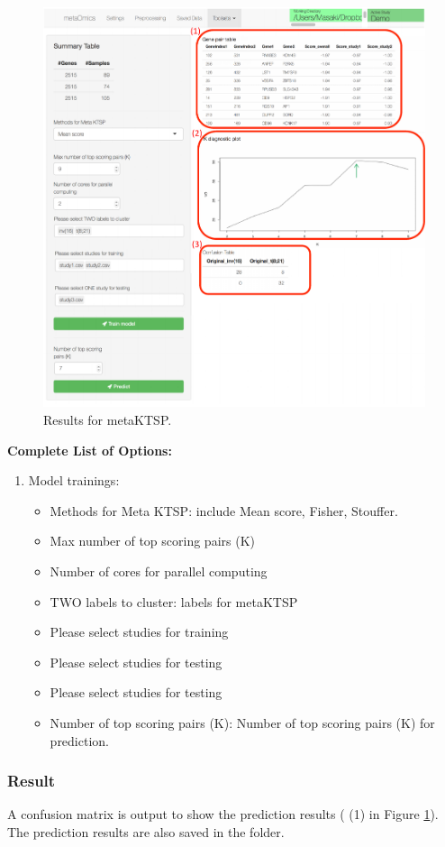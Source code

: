 \begin{steps}
\begin{figure}[H]
\begin{center}
\includegraphics[scale=0.7]{./figure/MetaKTSP/MetaKTSPresult.pdf}
\caption{Results for metaKTSP.}
\label{fig:MetaKTSPresult}
\end{center}
\end{figure}

\end{steps}

\textbf{Complete List of Options:} 
\begin{enumerate}
\item Model trainings: 
\begin{itemize}
\item Methods for Meta KTSP: include Mean score, Fisher, Stouffer.
\item Max number of top scoring pairs (K)
\item Number of cores for parallel computing
\item TWO labels to cluster: labels for metaKTSP
\item Please select studies for training
\item Please select studies for testing
\item Please select studies for testing
\item Number of top scoring pairs (K): Number of top scoring pairs (K) for prediction.
\end{itemize}

\end{enumerate}

\subsubsection{Result}

A confusion matrix is output to show the prediction results ({\color{red} (1)} in Figure \ref{fig:MetaKTSPresult}).
The prediction results are also saved in the folder.


